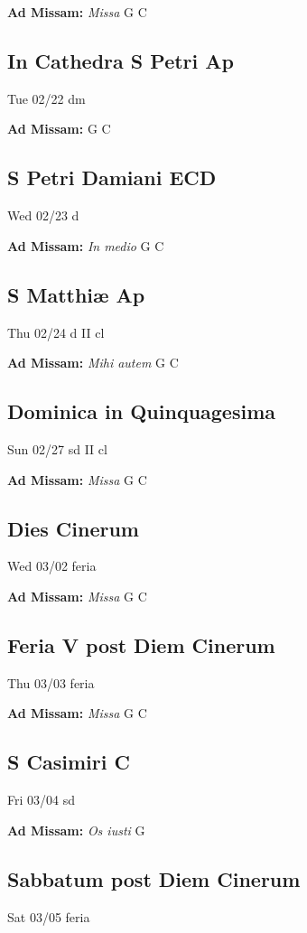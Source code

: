 \documentclass[letterpaper, 10pt, twocolumn]{article}
\begin{document}
\textbf{Ad Missam:} \textit{Missa} G C 

\subsection*{In Cathedra S Petri Ap}Tue 02/22 dm

\textbf{Ad Missam:} \textit{} G C 

\subsection*{S Petri Damiani ECD}Wed 02/23 d

\textbf{Ad Missam:} \textit{In medio} G C 

\subsection*{S Matthiæ Ap}Thu 02/24 d II cl

\textbf{Ad Missam:} \textit{Mihi autem} G C 

\subsection*{Dominica in Quinquagesima}Sun 02/27 sd II cl

\textbf{Ad Missam:} \textit{Missa} G C 

\subsection*{Dies Cinerum}Wed 03/02 feria

\textbf{Ad Missam:} \textit{Missa} G C 

\subsection*{Feria V post Diem Cinerum}Thu 03/03 feria

\textbf{Ad Missam:} \textit{Missa} G C 

\subsection*{S Casimiri C}Fri 03/04 sd

\textbf{Ad Missam:} \textit{Os iusti} G 

\subsection*{Sabbatum post Diem Cinerum}Sat 03/05 feria
\end{document}
